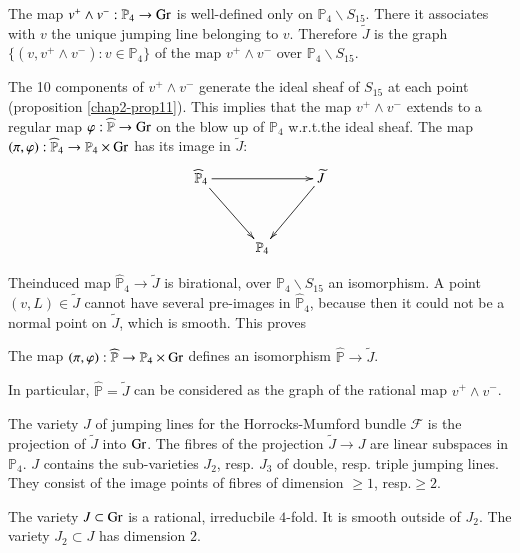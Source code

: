 The map $v^{+}\wedge v^{-}:\mathbb{P}_{4}\to \operatorname{Gr}$ is well-defined only
on $\mathbb{P}_{4}\backslash S_{15}$. There it associates with $v$ the
unique jumping line belonging to $v$. Therefore $\widetilde{J}$ is the
graph $\{(v,v^{+}\wedge v^{-}):v\in \mathbb{P}_{4}\}$ of the map
$v^{+}\wedge v^{-}$ over $\mathbb{P}_{4}\backslash S_{15}$.

The 10 components of $v^{+}\wedge v^{-}$ generate the ideal sheaf of
$S_{15}$ at each point (proposition \ref{chap2-prop11}). This implies
that the map $v^{+}\wedge v^{-}$ extends to a regular map
$\varphi:\widehat{\mathbb{P}}\to \operatorname{Gr}$ on the blow up of
$\mathbb{P}_{4}$ w.r.t.\@ the ideal sheaf. The map
$(\pi, \varphi):\widehat{\mathbb{P}}_{4}\to \mathbb{P}_{4}\times \operatorname{Gr}$
has its image in $\widetilde{J}$:
\[
\xymatrix@R=1.2cm@C=1cm{
\widehat{\mathbb{P}}_{4}\ar[rr]\ar[dr] & & \widetilde{J}\ar[dl]\\
 & \mathbb{P}_{4} &
}
\]

The\pageoriginale induced map
$\widehat{\mathbb{P}}_{4}\to \widetilde{J}$ is birational, over
$\mathbb{P}_{4}\backslash S_{15}$ an isomorphism. A point
$(v,L)\in \widetilde{J}$ cannot have several pre-images in
$\widehat{\mathbb{P}}_{4}$, because then it could not be a normal
point on $\widetilde{J}$, which is smooth. This proves

\begin{proposition}\label{chap2-prop16}
The map
$(\pi,\varphi):\widehat{\mathbb{P}}\to \mathbb{P}_{4}\times \operatorname{Gr}$
defines an isomorphism $\widehat{\mathbb{P}}\to \widetilde{J}$. 
\end{proposition}

In particular, $\widehat{\mathbb{P}}=\widetilde{J}$ can be considered
as the graph of the rational map $v^{+}\wedge v^{-}$.

The variety $J$ of jumping lines for the Horrocks-Mumford bundle
$\mathscr{F}$ is the projection of $\widetilde{J}$ into $\operatorname{Gr}$. The
fibres of the projection $\widetilde{J}\to J$ are linear subspaces in
$\mathbb{P}_{4}$. $J$ contains the sub-varieties $J_{2}$,
resp. $J_{3}$ of double, resp. triple jumping lines. They consist of
the image points of fibres of dimension $\geq 1$, resp.\@ $\geq 2$.

\begin{theorem}\label{chap2-thm2}
The variety $J\subset \operatorname{Gr}$ is a rational, irreducbile $4$-fold. It is
smooth outside of $J_{2}$. The variety $J_{2}\subset J$ has dimension
$2$. 
\end{theorem}

